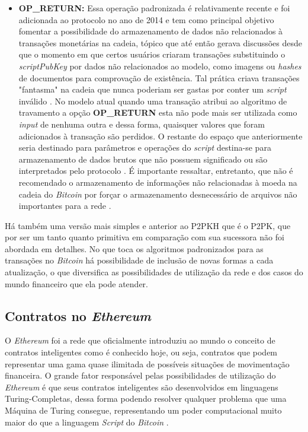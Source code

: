 \begin{itemize}
    \item \textbf{OP\_RETURN:} Essa operação padronizada é relativamente recente e foi adicionada ao protocolo no ano de 2014 \cite{smart_contracts:bitcoin_0.9} e tem como principal objetivo fomentar a possibilidade do armazenamento de dados não relacionados à transações monetárias na cadeia, tópico que até então gerava discussões desde que o momento em que certos usuários criaram transações substituindo o \textit{scriptPubKey} por dados não relacionados ao modelo, como imagens ou \textit{hashes} de documentos para comprovação de existência. Tal prática criava transações "fantasma" na cadeia que nunca poderiam ser gastas por conter um \textit{script} inválido \cite{blockchain:mastering_bitcoin}. No modelo atual quando uma transação atribui ao algoritmo de travamento a opção \textbf{OP\_RETURN} esta não pode mais ser utilizada como \textit{input} de nenhuma outra e dessa forma, quaisquer valores que foram adicionados à transação são perdidos. O restante do espaço que anteriormente seria destinado para parâmetros e operações do \textit{script} destina-se para armazenamento de dados brutos que não possuem significado ou são interpretados pelo protocolo \cite{smart_contracts:learn_me_a_bitcoin}. É importante ressaltar, entretanto, que não é recomendado o armazenamento de informações não relacionadas à moeda na cadeia do \textit{Bitcoin} por forçar o armazenamento desnecessário de arquivos não importantes para a rede  \cite{smart_contracts:bitcoin_0.9}.
\end{itemize}

Há também uma versão mais simples e anterior ao P2PKH que é o P2PK, que por ser um tanto quanto primitiva em comparação com sua sucessora não foi abordada em detalhes. No que toca os algoritmos padronizados para as transações no \textit{Bitcoin} há possibilidade de inclusão de novas formas a cada atualização, o que diversifica as possibilidades de utilização da rede e dos casos do mundo financeiro que ela pode atender. 

\subsection{Contratos no \textit{Ethereum}}

O \textit{Ethereum} foi a rede que oficialmente introduziu ao mundo o conceito de contratos inteligentes como é conhecido hoje, ou seja, contratos que podem representar uma gama quase ilimitada de possíveis situações de movimentação financeira. O grande fator responsável pelas possibilidades de utilização do \textit{Ethereum} é que seus contratos inteligentes são desenvolvidos em linguagens Turing-Completas, dessa forma podendo resolver qualquer problema que uma Máquina de Turing consegue, representando um poder computacional muito maior do que a linguagem \textit{Script} do \textit{Bitcoin} \cite{blockchain:capitulo5}.


